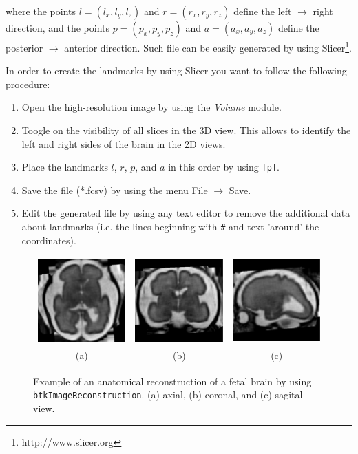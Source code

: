 \begin{description}
where the points $l=(l_x, l_y, l_z)$ and $r=(r_x, r_y, r_z)$ define the
left $\rightarrow$ right direction, and the points $p=(p_x, p_y, p_z)$ and
$a=(a_x, a_y, a_z)$ define the posterior $\rightarrow$ anterior direction. Such
file can be easily generated by using Slicer\footnote{http://www.slicer.org}.

In order to create the landmarks by using Slicer you want to follow the
following procedure:

\begin{enumerate}
\item Open the high-resolution image by using the \textit{Volume} module.
\item Toogle on the visibility of all slices in the 3D view. This allows to
identify the left and right sides of the brain in the 2D views.
\item Place the landmarks $l$, $r$, $p$, and $a$ in this order by using
\texttt{[p]}.
\item Save the file (*.fcsv) by using the menu File $\rightarrow$ Save.
\item Edit the generated file by using any text editor to remove the additional
data about landmarks (i.e. the lines beginning with \texttt{\#} and text
'around' the coordinates).
\end{enumerate}


\begin{figure}[t]
\centering
\begin{tabular}{ccc}
\includegraphics[width=0.3\columnwidth]{hr_axl.eps}&
\includegraphics[width=0.3\columnwidth]{hr_cor.eps}&
\includegraphics[width=0.3\columnwidth]{hr_sag.eps}\\
{(a)}&{(b)}&{(c)}\\
\end{tabular}
\caption{Example of an anatomical reconstruction of a fetal brain by using
\texttt{btkImageReconstruction}. (a) axial, (b) coronal, and (c) sagital view.}
\label{fig:reconstruction}
\end{figure}


\end{description}
